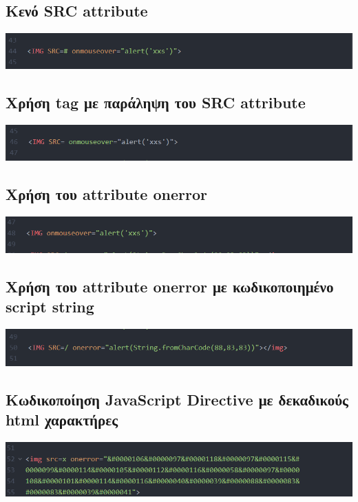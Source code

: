 \subsection{Κενό SRC attribute}
\begin{center}
			\includegraphics[width=1\textwidth]{image/16.PNG}		
\end{center}
\subsection{Χρήση tag με παράληψη του SRC attribute}
\begin{center}
			\includegraphics[width=1\textwidth]{image/17.PNG}		
\end{center}
\subsection{Χρήση του attribute onerror}
\begin{center}
			\includegraphics[width=1\textwidth]{image/18.PNG}		
\end{center}
\subsection{Χρήση του attribute onerror με κωδικοποιημένο script string}
\begin{center}
			\includegraphics[width=1\textwidth]{image/19.PNG}		
\end{center}
\subsection{Κωδικοποίηση JavaScript Directive με δεκαδικούς html χαρακτήρες}
\begin{center}
			\includegraphics[width=1\textwidth]{image/20.PNG}		
\end{center}
